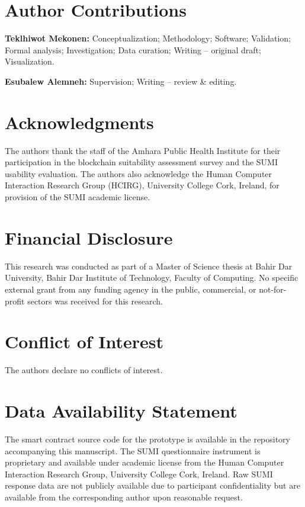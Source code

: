 \documentclass[AMA,LATO1COL]{WileyNJD-v2}
\begin{document}

\section*{Author Contributions}
\textbf{Teklhiwot Mekonen:} Conceptualization; Methodology; Software; Validation; Formal analysis; Investigation; Data curation; Writing -- original draft; Visualization.

\textbf{Esubalew Alemneh:} Supervision; Writing -- review \& editing.

\section*{Acknowledgments}
The authors thank the staff of the Amhara Public Health Institute for their participation in the blockchain suitability assessment survey and the SUMI usability evaluation. The authors also acknowledge the Human Computer Interaction Research Group (HCIRG), University College Cork, Ireland, for provision of the SUMI academic license.

\section*{Financial Disclosure}
This research was conducted as part of a Master of Science thesis at Bahir Dar University, Bahir Dar Institute of Technology, Faculty of Computing. No specific external grant from any funding agency in the public, commercial, or not-for-profit sectors was received for this research.

\section*{Conflict of Interest}
The authors declare no conflicts of interest.

\section*{Data Availability Statement}
The smart contract source code for the prototype is available in the repository accompanying this manuscript. The SUMI questionnaire instrument is proprietary and available under academic license from the Human Computer Interaction Research Group, University College Cork, Ireland. Raw SUMI response data are not publicly available due to participant confidentiality but are available from the corresponding author upon reasonable request.
\end{document}
